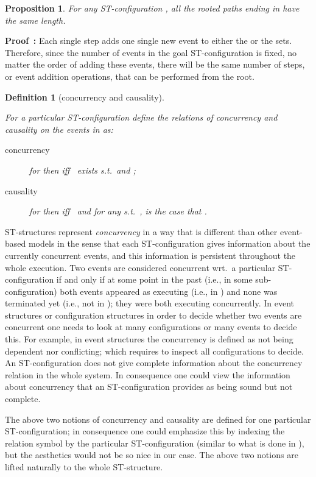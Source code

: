 \documentclass[submission,copyright,creativecommons]{eptcs}
\newtheorem{proposition}[theorem]{Proposition}
\newtheorem{definition}[theorem]{Definition}
\newenvironment{proof}[1][\!\!\,]{\vspace{1ex}\noindent\textbf{Proof #1: }}{\hfill\vspace{2ex}}
\newcounter{case}
\begin{document}
\begin{proposition}\label{prop_pathsEqualLength}
For any ST-configuration , all the rooted paths ending in   have the same length.
\end{proposition}

\begin{proof}
Each single step adds one single new event to either the  or the  sets. Therefore, since the number of events in the goal ST-configuration  is fixed, no matter the order of adding these events, there will be the same number of steps, or event addition operations, that can be performed from the root.
\end{proof}


\begin{definition}[concurrency and causality]\label{def_ConcCausal}\ 

For a particular ST-configuration  define the relations of \emph{concurrency} and \emph{causality} on the events in  as:
\begin{description}
\item[concurrency] for  then  iff \, exists  s.t.\  and ;
\item[causality] for  then  iff \,  and for any  s.t.\ , is the case that .
 \end{description}
\end{definition}

ST-structures represent \textit{concurrency} in a way that is different than other event-based models in the sense that each ST-configuration gives information about the currently concurrent events, and this information is persistent throughout the whole execution.
Two events are considered concurrent wrt.\ a particular ST-configuration if and only if at some point in the past (i.e., in some sub-configuration) both events appeared as executing (i.e., in ) and none was terminated yet (i.e., not in ); they were both executing concurrently.
In event structures or configuration structures in order to decide whether two events are concurrent one needs to look at many configurations or many events to decide this. For example, in event structures the concurrency is defined as not being dependent nor conflicting; which requires to inspect all configurations to decide.
An ST-configuration does not give complete information about the concurrency relation in the whole system. In consequence one could view the information about concurrency that an ST-configuration provides as being sound but not complete.

The above two notions of concurrency and causality are defined for one particular ST-configura\-tion; in consequence one could emphasize this by indexing the relation symbol by the particular ST-configuration (similar to what is done in \cite[Sec.5.3]{GlabbeekG01refinement}), but the aesthetics would not be so nice in our case.
The above two notions are lifted naturally to the whole ST-structure.
\end{document}
